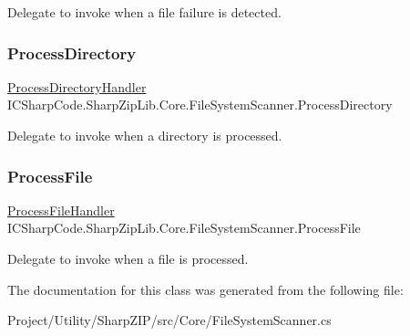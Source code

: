 Delegate to invoke when a file failure is detected. 

\mbox{\label{class_i_c_sharp_code_1_1_sharp_zip_lib_1_1_core_1_1_file_system_scanner_abc556d005a5f1fd888cd5505d8e1bb3b}} 
\subsubsection{\texorpdfstring{Process\+Directory}{ProcessDirectory}}
{\footnotesize\ttfamily \hyperlink{namespace_i_c_sharp_code_1_1_sharp_zip_lib_1_1_core_a37bb92cd3528127a005ef2ca4dd478f5}{Process\+Directory\+Handler} I\+C\+Sharp\+Code.\+Sharp\+Zip\+Lib.\+Core.\+File\+System\+Scanner.\+Process\+Directory}



Delegate to invoke when a directory is processed. 

\mbox{\label{class_i_c_sharp_code_1_1_sharp_zip_lib_1_1_core_1_1_file_system_scanner_a7a9c09fd30a1dff0384a98b84a8e2723}} 
\subsubsection{\texorpdfstring{Process\+File}{ProcessFile}}
{\footnotesize\ttfamily \hyperlink{namespace_i_c_sharp_code_1_1_sharp_zip_lib_1_1_core_abba22d663b2d9f4fa4bda2dc2e867bb4}{Process\+File\+Handler} I\+C\+Sharp\+Code.\+Sharp\+Zip\+Lib.\+Core.\+File\+System\+Scanner.\+Process\+File}



Delegate to invoke when a file is processed. 



The documentation for this class was generated from the following file\+:\begin{DoxyCompactItemize}
\item 
Project/\+Utility/\+Sharp\+Z\+I\+P/src/\+Core/File\+System\+Scanner.\+cs\end{DoxyCompactItemize}
